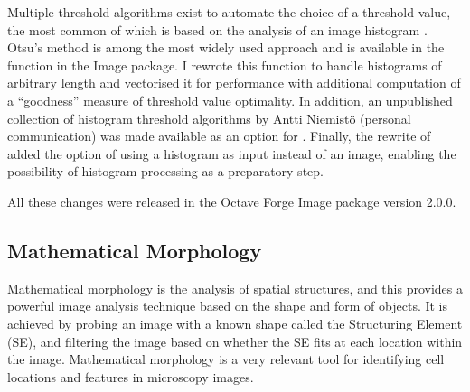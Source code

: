 Multiple threshold algorithms exist to automate the choice of a
threshold value, the most common of which is based on the analysis
of an image histogram \citep{analysis-hist-threshold}.  Otsu's method
\citep{otsu-threshold} is among the most widely used approach
and is available in the function  in the Image
package.  I rewrote this function to handle histograms of arbitrary
length and vectorised it for performance with additional computation of a
``goodness'' measure of threshold value optimality.
In addition, an unpublished collection of histogram
threshold algorithms by Antti Niemistö (personal communication)
was made available as an
option for .  Finally, the rewrite
of  added the
option of using a histogram as input instead of an image, enabling
the possibility of histogram processing as a preparatory step.


All these changes were released in the Octave Forge Image
package version 2.0.0.

\subsection{Mathematical Morphology}

Mathematical morphology is the analysis of spatial
structures, and this provides a powerful image analysis technique based on
the shape and form of objects.  It is achieved by probing an image
with a known shape called the Structuring Element (SE), and filtering the
image based on whether the SE fits at each location
within the image.
Mathematical morphology is a very relevant tool for identifying cell
locations and features in microscopy images.

